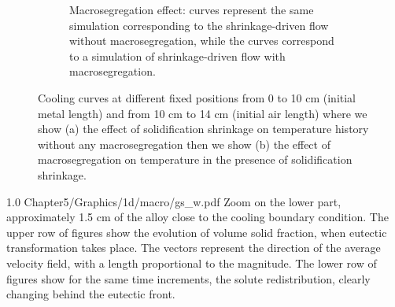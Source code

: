 \begin{figure}[htbp]
\begin{subfigure}[t]{0.8\textwidth}
	\caption{Macrosegregation effect:  curves represent the same simulation corresponding to the shrinkage-driven flow without macrosegregation, while
	the  curves correspond to a simulation of shrinkage-driven flow with macrosegregation.}
    \label{fig:macro_effect}
  \end{subfigure}
\caption{Cooling curves at different fixed positions from 0 to 10 cm (initial metal length) and from 10 cm to 14 cm (initial air length) 
where we show (a) the effect of solidification shrinkage on temperature history without any macrosegregation then
we show (b) the effect of macrosegregation on temperature in the presence of solidification shrinkage.} 
\label{fig:1dasi7_macro_shrinkage}
\end{figure}

\begin{figureth}
{1.0}
{Chapter5/Graphics/1d/macro/gs_w.pdf}
{Zoom on the lower part, approximately 1.5 cm of the alloy close to the cooling boundary condition. 
The upper row of figures show the evolution of volume solid fraction, when eutectic transformation takes place. 
The vectors represent the direction of the average velocity field, with a length proportional
to the magnitude. The lower row of figures show for the same time increments, the solute redistribution, 
clearly changing behind the eutectic front.}
\label{fig:1dalsi7_gs_w}
\end{figureth}

